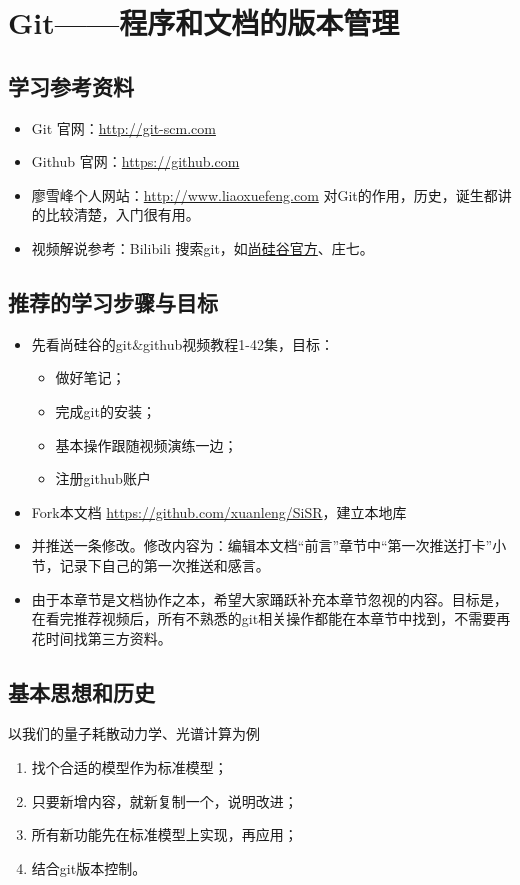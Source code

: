 \chapter{Git——程序和文档的版本管理}
\section{学习参考资料}
\begin{itemize}
\item Git 官网：\url{http://git-scm.com}

\item Github 官网：\url{https://github.com}

\item 廖雪峰个人网站：\url{http://www.liaoxuefeng.com} 对Git的作用，历史，诞生都讲的比较清楚，入门很有用。

\item 视频解说参考：Bilibili 搜索git，如\href{https://www.bilibili.com/video/BV1pW411A7a5?from=search&seid=3815767452396308043}{尚硅谷官方}、庄七。
\end{itemize}


\section{推荐的学习步骤与目标}
\begin{itemize}
\item 先看尚硅谷的git\&github视频教程1-42集，目标：
	\begin{itemize}
	\item 做好笔记；
	\item 完成git的安装；
	\item 基本操作跟随视频演练一边；
	\item 注册github账户
 	\end{itemize}
\item Fork本文档 \url{https://github.com/xuanleng/SiSR}，建立本地库
\item 并推送一条修改。修改内容为：编辑本文档“前言”章节中“第一次推送打卡”小节，记录下自己的第一次推送和感言。
\item 由于本章节是文档协作之本，希望大家踊跃补充本章节忽视的内容。目标是，在看完推荐视频后，所有不熟悉的git相关操作都能在本章节中找到，不需要再花时间找第三方资料。
\end{itemize}


\section{基本思想和历史}
以我们的量子耗散动力学、光谱计算为例
\begin{enumerate}
\item 找个合适的模型作为标准模型；
\item 只要新增内容，就新复制一个，说明改进；
\item 所有新功能先在标准模型上实现，再应用；
\item 结合git版本控制。
\end{enumerate}


